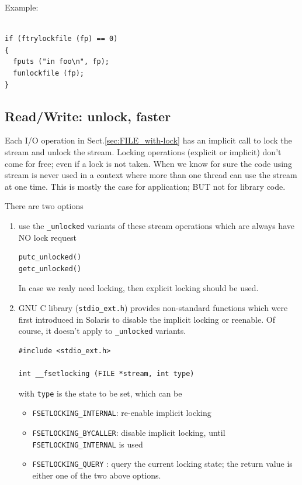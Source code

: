 Example:
\begin{verbatim}

if (ftrylockfile (fp) == 0)
{
  fputs ("in foo\n", fp);
  funlockfile (fp);
}
\end{verbatim}




\subsection{Read/Write: unlock, faster}
\label{sec:FILE_nolock}

Each I/O operation in Sect.\ref{sec:FILE_with-lock} has an implicit call to lock
the stream and unlock the stream. Locking operations (explicit or implicit)
don't come for free; even if a lock is not taken. When we know for sure the code
using stream is never used in a context where more than one thread can use the
stream at one time. This is mostly the case for application; BUT not for library
code. 

There are two options
\begin{enumerate}
  \item use the \verb!_unlocked! variants of these stream operations which are
  always have NO lock request
\begin{verbatim}
putc_unlocked()
getc_unlocked()
\end{verbatim}
In case we realy need locking, then explicit locking should be used.

  \item GNU C library (\verb!stdio_ext.h!) provides non-standard functions which
  were first introduced in Solaris to disable the implicit locking or reenable.
  Of course, it doesn't apply to \verb!_unlocked! variants.
  
\begin{verbatim}
#include <stdio_ext.h>

int __fsetlocking (FILE *stream, int type)
\end{verbatim}
with \verb!type! is the state to be set, which can be 
\begin{itemize}	
  \item \verb!FSETLOCKING_INTERNAL!: re-enable implicit locking
  \item \verb!FSETLOCKING_BYCALLER!: disable implicit locking, until
  \verb!FSETLOCKING_INTERNAL! is used
  \item \verb!FSETLOCKING_QUERY! : query the current locking state; the return
  value is either one of the two above options.
\end{itemize}

\end{enumerate}

